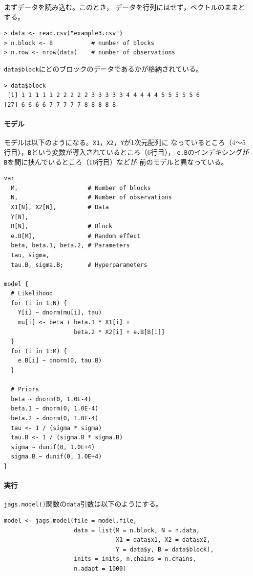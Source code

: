 \documentclass[11pt,uplatex]{jsarticle}
\begin{document}
まずデータを読み込む。このとき，
データを行列にはせず，ベクトルのままとする。
\begin{lstlisting}
> data <- read.csv("example3.csv")
> n.block <- 8           # number of blocks
> n.row <- nrow(data)    # number of observations
\end{lstlisting}

\texttt{data\$block}にどのブロックのデータであるかが格納されている。
\begin{lstlisting}
> data$block
 [1] 1 1 1 1 1 2 2 2 2 2 3 3 3 3 3 4 4 4 4 4 5 5 5 5 5 6
[27] 6 6 6 6 7 7 7 7 7 8 8 8 8 8
\end{lstlisting}

\paragraph{モデル}

モデルは以下のようになる。\texttt{X1}，\texttt{X2}，\texttt{Y}が1次元配列に
なっているところ（4〜5行目），\texttt{B}という変数が導入されているところ（6行目），
\texttt{e.B}のインデキシングが\texttt{B}を間に挟んでいるところ（16行目）などが
前のモデルと異なっている。

\begin{lstlisting}
var
  M,                    # Number of blocks
  N,                    # Number of observations
  X1[N], X2[N],         # Data
  Y[N],
  B[N],                 # Block
  e.B[M],               # Random effect
  beta, beta.1, beta.2, # Parameters
  tau, sigma,
  tau.B, sigma.B;       # Hyperparameters

model {
  # Likelihood
  for (i in 1:N) {
    Y[i] ~ dnorm(mu[i], tau)
    mu[i] <- beta + beta.1 * X1[i] +
                    beta.2 * X2[i] + e.B[B[i]]
  }
  for (i in 1:M) {
    e.B[i] ~ dnorm(0, tau.B)
  }

  # Priors
  beta ~ dnorm(0, 1.0E-4)
  beta.1 ~ dnorm(0, 1.0E-4)
  beta.2 ~ dnorm(0, 1.0E-4)
  tau <- 1 / (sigma * sigma)
  tau.B <- 1 / (sigma.B * sigma.B)
  sigma ~ dunif(0, 1.0E+4)
  sigma.B ~ dunif(0, 1.0E+4)
}
\end{lstlisting}

\paragraph{実行}

\texttt{jags.model()}関数の\texttt{data}引数は以下のようにする。
\begin{lstlisting}
model <- jags.model(file = model.file,
                    data = list(M = n.block, N = n.data,
                                X1 = data$x1, X2 = data$x2,
                                Y = data$y, B = data$block),
                    inits = inits, n.chains = n.chains,
                    n.adapt = 1000)
\end{lstlisting}
\end{document}
